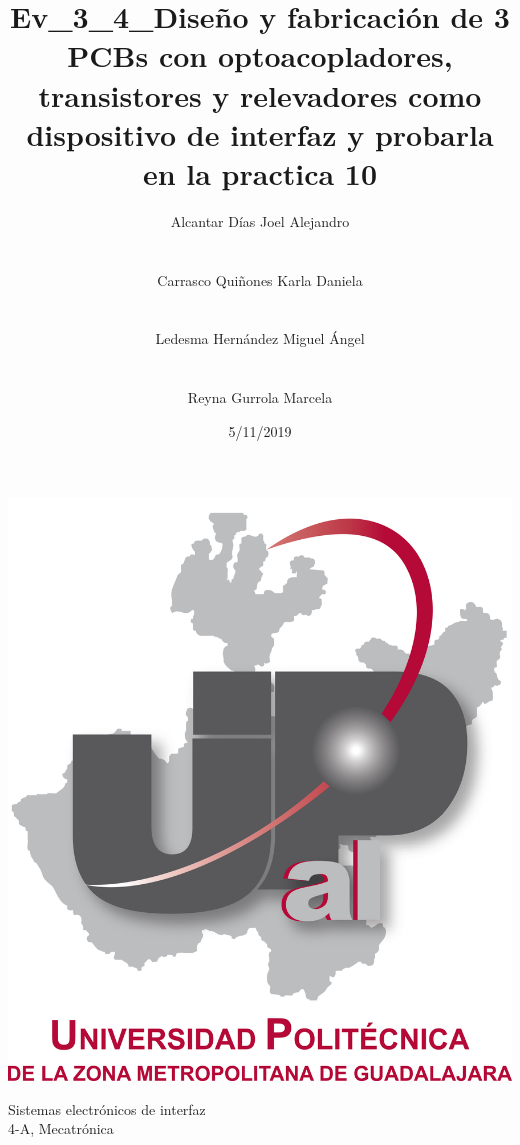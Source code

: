 \documentclass[letterpaper]{article}
\title{Ev\_3\_4\_Diseño y fabricación de 3 PCBs con optoacopladores, transistores y relevadores como dispositivo de interfaz y probarla en la practica 10}
\author{Alcantar Días Joel Alejandro \\\\\\ Carrasco Quiñones Karla Daniela \\\\\\ Ledesma Hernández Miguel Ángel \\\\\\ Reyna Gurrola Marcela}
\date{5/11/2019}
\begin{document}
\maketitle
\vspace{2cm}
\begin{center}
    \includegraphics[scale=0.4]{IMG/UPZMGlog.png}\\
    \vspace{2cm}
    \begin{large}
        Sistemas electrónicos de interfaz\\
        4-A, Mecatrónica\\
    \end{large}
\end{center}

\newpage
\end{document}
